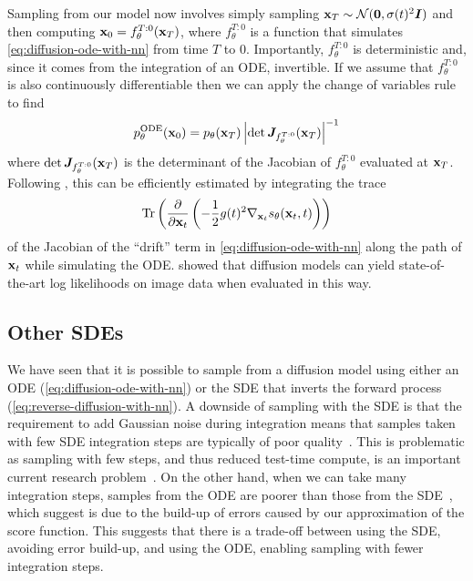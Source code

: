 Sampling from our model now involves simply sampling ${\mathbf{x}}_T \sim {\mathcal{N}}({\bm{0}}, \sigma(t)^2{\bm{I}})$ and then computing ${\mathbf{x}}_0 = f^{T:0}_\theta({\mathbf{x}}_T)$, where $f^{T:0}_\theta$ is a function that simulates \cref{eq:diffusion-ode-with-nn} from time $T$ to $0$. Importantly, $f^{T:0}_\theta$ is deterministic and, since it comes from the integration of an ODE, invertible. If we assume that $f^{T:0}_\theta$ is also continuously differentiable then we can apply the change of variables rule to find
\begin{equation}
    p_\theta^\text{ODE}({\mathbf{x}}_0) = p_\theta({\mathbf{x}}_T) \left| \det {\bm{J}}_{f^{T:0}_\theta}({\mathbf{x}}_T) \right|^{-1}
\end{equation}
where $\det {\bm{J}}_{f^{T:0}_\theta}({\mathbf{x}}_T)$ is the determinant of the Jacobian of $f^{T:0}_\theta$ evaluated at ${\mathbf{x}}_T$. Following \citet{chen2018neural}, this can be efficiently estimated by integrating the trace
\begin{equation}
    \text{Tr}\left( \frac{\partial}{\partial {\mathbf{x}}_t} \left( - \frac{1}{2} g(t)^2 \nabla_{{\mathbf{x}}_t} s_\theta({\mathbf{x}}_t, t) \right)
    \right)
\end{equation}
of the Jacobian of the ``drift'' term in \cref{eq:diffusion-ode-with-nn} along the path of ${\mathbf{x}}_t$ while simulating the ODE. \citet{song2020score} showed that diffusion models can yield state-of-the-art log likelihoods on image data when evaluated in this way.

\subsection{Other SDEs}
We have seen that it is possible to sample from a diffusion model using either an ODE (\cref{eq:diffusion-ode-with-nn}) or the SDE that inverts the forward process (\cref{eq:reverse-diffusion-with-nn}). A downside of sampling with the SDE is that the requirement to add Gaussian noise during integration means that samples taken with few SDE integration steps are typically of poor quality~\citep{song2020denoising,karras2022elucidating}. This is problematic as sampling with few steps, and thus reduced test-time compute, is an important current research problem~\citep{salimans2022progressive,meng2022distillation,esser2024scaling}. On the other hand, when we can take many integration steps, samples from the ODE are poorer than those from the SDE~\citep{song2020denoising}, which \citep{karras2022elucidating} suggest is due to the build-up of errors caused by our approximation of the score function. This suggests that there is a trade-off between using the SDE, avoiding error build-up, and using the ODE, enabling sampling with fewer integration steps.

